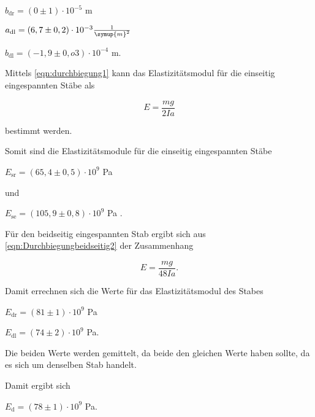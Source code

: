 \centerline{$b_\text{dr} = (0 \pm 1) \cdot 10^{-5} $ m}
\vspace{1em}
\centerline{$a_\text{dl} = (6,7 \pm 0,2) \cdot 10^{-3} \frac{1}{\symup{m}^2} $}

\centerline{$b_\text{dl} = (-1,9 \pm 0,o3) \cdot 10^{-4} $ m.}
\vspace{1em}

Mittels \eqref{eqn:durchbiegung1} kann das Elastizitätsmodul für die einseitig eingespannten Stäbe als

\begin{equation}
  E = \frac{m g}{2 I a}
\end{equation}

bestimmt werden.

Somit sind die Elastizitätsmodule für die einseitig eingespannten Stäbe

\vspace{.5em}
\centerline{$E_\text{sr} = (65,4 \pm 0,5) \cdot 10^9$ Pa}
\vspace{.5em}

und

\vspace{.5em}
\centerline{$E_\text{se} = (105,9 \pm 0,8) \cdot 10^9$ Pa .}
\vspace{.5em}

Für den beidseitig eingespannten Stab ergibt sich aus \eqref{eqn:Durchbiegungbeidseitig2} der Zusammenhang

\begin{equation}
  E = \frac{m g}{48 I a}.
\end{equation}

Damit errechnen sich die Werte für das Elastizitätsmodul des Stabes

\vspace{.5em}
\centerline{$E_\text{dr}  = (81 \pm 1) \cdot 10^9$ Pa}
\vspace{.5em}

\vspace{.5em}
\centerline{$E_\text{dl}  = (74 \pm 2) \cdot 10^9$ Pa.}
\vspace{.5em}

Die beiden Werte werden gemittelt, da beide den gleichen Werte haben sollte, da es sich um denselben Stab handelt.

Damit ergibt sich

\vspace{.5em}
\centerline{$E_\text{d} = (78 \pm 1) \cdot 10^9$ Pa.}
\vspace{.5em}

